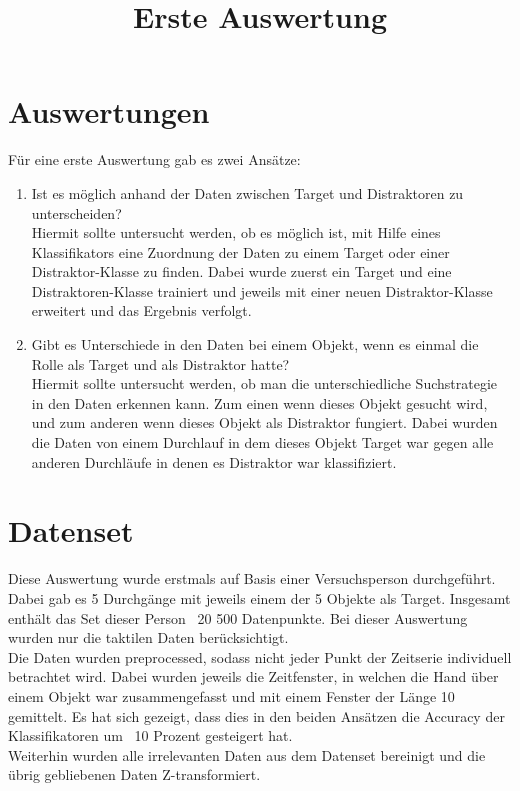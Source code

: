 \documentclass[]{report}
\title{Erste Auswertung}
\author{}
\date{}
\begin{document}
\maketitle
\section*{Auswertungen}
Für eine erste Auswertung gab es zwei Ansätze:
\begin{enumerate}
\item Ist es möglich anhand der Daten zwischen Target und Distraktoren zu unterscheiden?\\
Hiermit sollte untersucht werden, ob es möglich ist, mit Hilfe eines Klassifikators eine Zuordnung der Daten zu einem Target oder einer Distraktor-Klasse zu finden. Dabei wurde zuerst ein Target und eine Distraktoren-Klasse trainiert und jeweils mit einer neuen Distraktor-Klasse erweitert und das Ergebnis verfolgt.

\item Gibt es Unterschiede in den Daten bei einem Objekt, wenn es einmal die Rolle als Target und als Distraktor hatte?\\
Hiermit sollte untersucht werden, ob man die unterschiedliche Suchstrategie in den Daten erkennen kann. Zum einen wenn dieses Objekt gesucht wird, und zum anderen wenn dieses Objekt als Distraktor fungiert. Dabei wurden die Daten von einem Durchlauf in dem dieses Objekt Target war gegen alle anderen Durchläufe in denen es Distraktor war klassifiziert.
\end{enumerate}

\section*{Datenset}
Diese Auswertung wurde erstmals auf Basis einer Versuchsperson durchgeführt. Dabei gab es 5 Durchgänge mit jeweils einem der 5 Objekte als Target. Insgesamt enthält das Set dieser Person ~20 500 Datenpunkte. Bei dieser Auswertung wurden nur die taktilen Daten berücksichtigt. \\
Die Daten wurden preprocessed, sodass nicht jeder Punkt der Zeitserie individuell betrachtet wird. Dabei wurden jeweils die Zeitfenster, in welchen die Hand über einem Objekt war zusammengefasst und mit einem Fenster der Länge 10 gemittelt. Es hat sich gezeigt, dass dies in den beiden Ansätzen die Accuracy der Klassifikatoren um ~10 Prozent gesteigert hat.\\
Weiterhin wurden alle irrelevanten Daten aus dem Datenset bereinigt und die übrig gebliebenen Daten Z-transformiert.
\end{document}
